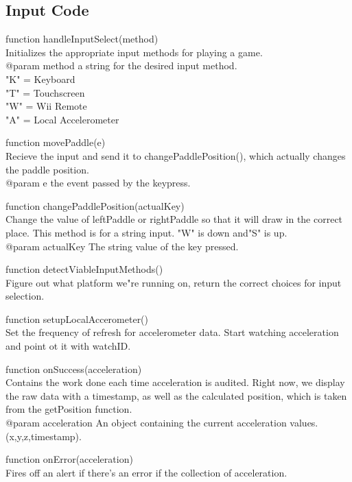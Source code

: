 \documentclass[12pt]{article}
\newenvironment{itemize*}%
  {\begin{itemize}%
  	\setlength{\parsep}{0pt}
    \setlength{\itemsep}{0pt}%
    \setlength{\parskip}{0pt}}%
  {\end{itemize}}
\begin{document}
\subsection{Input Code}
\begin{itemize*}
\item function handleInputSelect(method)\\
Initializes the appropriate input methods for playing a game.\\
@param {method} a string for the desired input method. \\
"K" = Keyboard\\
"T" = Touchscreen\\
"W" = Wii Remote\\
"A" = Local Accelerometer
\item function movePaddle(e)\\
Recieve the input and send it to changePaddlePosition(), which actually changes the paddle position.\\
@param {e} the event passed by the keypress.
\item function changePaddlePosition(actualKey)\\
Change the value of leftPaddle or rightPaddle so that it will draw in the correct place.  This method is for a string input.  "W" is down and"S" is up. \\
@param {actualKey} The string value of the key pressed.
\item function detectViableInputMethods()\\
Figure out what platform we"re running on, return the correct choices for input selection. 
\item function setupLocalAccerometer()\\
Set the frequency of refresh for accelerometer data.  Start watching acceleration and point ot it with watchID.
\item function onSuccess(acceleration)\\
Contains the work done each time acceleration is audited. Right now, we display the raw data with a timestamp, as well as the calculated position, which is taken from the getPosition function.\\
@param   acceleration    An object containing the current acceleration values. (x,y,z,timestamp).
\item function onError(acceleration)\\
Fires off an alert if there's an error if the collection of acceleration.
\end{itemize*}
\end{document}
